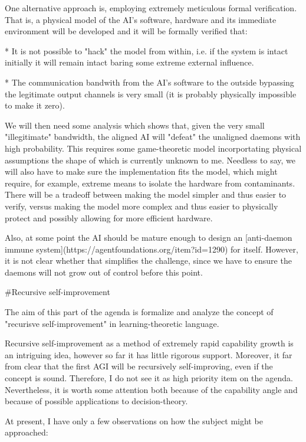 \documentclass[a4paper]{article}
\begin{document}
One alternative approach is, employing extremely meticulous formal verification. That is, a physical model of the AI's software, hardware and its immediate environment will be developed and it will be formally verified that:

* It is not possible to "hack" the model from within, i.e. if the system is intact initially it will remain intact baring some extreme external influence.

* The communication bandwith from the AI's software to the outside bypassing the legitimate output channels is very small (it is probably physically impossible to make it zero).

We will then need some analysis which shows that, given the very small "illegitimate" bandwidth, the aligned AI will "defeat" the unaligned daemons with high probability. This requires some game-theoretic model incorportating physical assumptions the shape of which is currently unknown to me. Needless to say, we will also have to make sure the implementation fits the model, which might require, for example, extreme means to isolate the hardware from contaminants. There will be a tradeoff between making the model simpler and thus easier to verify, versus making the model more complex and thus easier to physically protect and possibly allowing for more efficient hardware.

Also, at some point the AI should be mature enough to design an [anti-daemon immune system](https://agentfoundations.org/item?id=1290) for itself. However, it is not clear whether that simplifies the challenge, since we have to ensure the daemons will not grow out of control before this point.

\#Recursive self-improvement

The aim of this part of the agenda is formalize and analyze the concept of "recurisve self-improvement" in learning-theoretic language.

Recursive self-improvement as a method of extremely rapid capability growth is an intriguing idea, however so far it has little rigorous support. Moreover, it far from clear that the first AGI will be recursively self-improving, even if the concept is sound. Therefore, I do not see it as high priority item on the agenda. Nevertheless, it is worth some attention both because of the capability angle and because of possible applications to decision-theory.

At present, I have only a few observations on how the subject might be approached:
\end{document}
